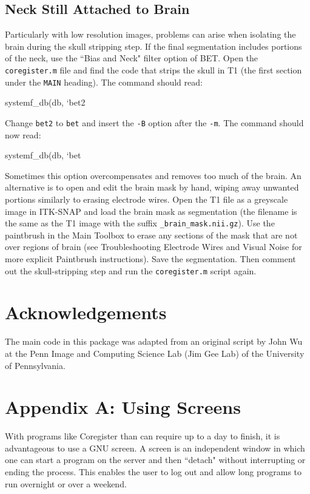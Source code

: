 \documentclass[12pt]{article}
\begin{document}
\subsection{Neck Still Attached to Brain}
Particularly with low resolution images, problems can arise when isolating the brain during the skull stripping step. If the final segmentation includes portions of the neck, use the ``Bias and Neck" filter option of BET. Open the \texttt{coregister.m} file and find the code that strips the skull in T1 (the first section under the \texttt{MAIN} heading). The command should read: 

\begin{verb}
systemf_db(db, `bet2 %
\end{verb}

Change \texttt{bet2} to \texttt{bet} and insert the \texttt{-B} option after the \texttt{-m}. The command should now read:

\begin{verb}
systemf_db(db, `bet %
\end{verb}

Sometimes this option overcompensates and removes too much of the brain. An alternative is to open and edit the brain mask by hand, wiping away unwanted portions similarly to erasing electrode wires. Open the T1 file as a greyscale image in ITK-SNAP and load the brain mask as segmentation (the filename is the same as the T1 image with the suffix \texttt{\_brain\_mask.nii.gz}). Use the paintbrush in the Main Toolbox to erase any sections of the mask that are not over regions of brain (see Troubleshooting Electrode Wires and Visual Noise for more explicit Paintbrush instructions). Save the segmentation. Then comment out the skull-stripping step and run the \texttt{coregister.m} script again.

\section{Acknowledgements}
The main code in this package was adapted from an original script by John Wu at the Penn Image and Computing Science Lab (Jim Gee Lab) of the University of Pennsylvania.

\section*{Appendix A: Using Screens}
With programs like Coregister than can require up to a day to finish, it is advantageous to use a GNU screen. A screen is an independent window in which one can start a program on the server and then ``detach" without interrupting or ending the process. This enables the user to log out and allow long programs to run overnight or over a weekend.
\end{document}
